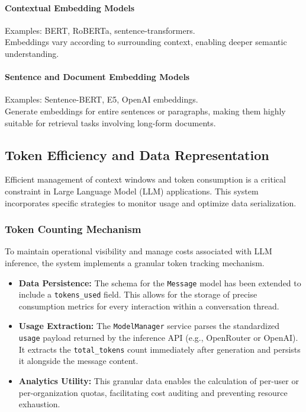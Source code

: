 \documentclass[12pt,a4paper]{article}
\begin{document}
\paragraph{Contextual Embedding Models}
Examples: BERT, RoBERTa, sentence-transformers.\\ 
Embeddings vary according to surrounding context, enabling deeper semantic understanding.

\paragraph{Sentence and Document Embedding Models}
Examples: Sentence-BERT, E5, OpenAI embeddings.\\
Generate embeddings for entire sentences or paragraphs, making them highly suitable for retrieval tasks involving long-form documents.

\subsection{Token Efficiency and Data Representation}

Efficient management of context windows and token consumption is a critical constraint in Large Language Model (LLM) applications. This system incorporates specific strategies to monitor usage and optimize data serialization.

\subsubsection{Token Counting Mechanism}

To maintain operational visibility and manage costs associated with LLM inference, the system implements a granular token tracking mechanism.

\begin{itemize}[leftmargin=1.5em]
    \item \textbf{Data Persistence:} The schema for the \texttt{Message} model has been extended to include a \texttt{tokens\_used} field. This allows for the storage of precise consumption metrics for every interaction within a conversation thread.
    \item \textbf{Usage Extraction:} The \texttt{ModelManager} service parses the standardized \texttt{usage} payload returned by the inference API (e.g., OpenRouter or OpenAI). It extracts the \texttt{total\_tokens} count immediately after generation and persists it alongside the message content.
    \item \textbf{Analytics Utility:} This granular data enables the calculation of per-user or per-organization quotas, facilitating cost auditing and preventing resource exhaustion.
\end{itemize}
\end{document}
